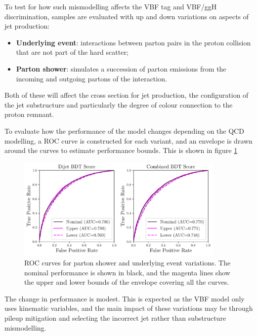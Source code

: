To test for how such mismodelling affects the VBF tag and VBF/ggH discrimination, samples are evaluated with up and down variations on aspects of jet production:
\begin{itemize}[noitemsep]
    \item \textbf{Underlying event}: interactions between parton pairs in the proton collision that are not part of the hard scatter;
    \item \textbf{Parton shower}: simulates a succession of parton emissions from the incoming and outgoing partons of the interaction.
\end{itemize}
Both of these will affect the cross section for jet production, the configuration of the jet substructure and particularly the degree of colour connection to the proton remnant.

To evaluate how the performance of the model changes depending on the QCD modelling, a ROC curve is constructed for each variant, and an envelope is drawn around the curves to estimate performance bounds. This is shown in figure \ref{fig:event_categorisation:ps_variant_validation}
\begin{figure}[h!]
    \begin{center}
        \includegraphics[width=0.9\textwidth]{figures/event_selection/psvar_ROCs_PS.pdf}
    \end{center}
    \caption{ROC curves for parton shower and underlying event variations. The nominal performance is shown in black, 
             and the magenta lines show the upper and lower bounds of the envelope covering all the curves.}
    \label{fig:event_categorisation:ps_variant_validation}
\end{figure}

The change in performance is modest. This is expected as the VBF model only uses kinematic variables, and the main impact of these variations may be through pileup mitigation and selecting the incorrect jet rather than substructure mismodelling. 


